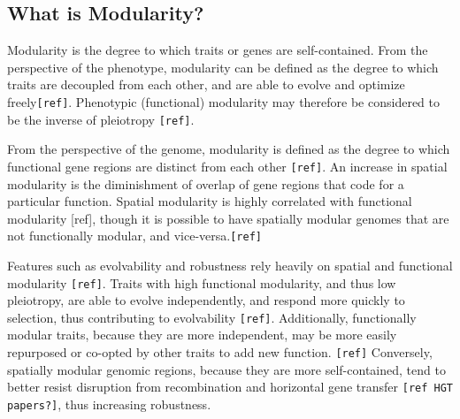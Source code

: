 \subsection{What is Modularity?}

Modularity is the degree to which traits or genes are self-contained. From the perspective of the phenotype, modularity can be defined as the degree to which traits are decoupled from each other, and are able to evolve and optimize freely\verb|[ref]|. Phenotypic (functional) modularity may therefore be considered to be the inverse of pleiotropy \verb|[ref]|.

From the perspective of the genome, modularity is defined as the degree to which functional gene regions are distinct from each other \verb|[ref]|. An increase in spatial modularity is the diminishment of overlap of gene regions that code for a particular function. Spatial modularity is highly correlated with functional modularity [ref], though it is possible to have spatially modular genomes that are not functionally modular, and vice-versa.\verb|[ref]|

Features such as evolvability and robustness rely heavily on spatial and functional modularity \verb|[ref]|. Traits with high functional modularity, and thus low pleiotropy, are able to evolve independently, and respond more quickly to selection, thus contributing to evolvability \verb|[ref]|. Additionally, functionally modular traits, because they are more independent, may be more easily repurposed or co-opted by other traits to add new function. \verb|[ref]|  Conversely, spatially modular genomic regions, because they are more self-contained, tend to better resist disruption from recombination \cite{misevic_sexual_2006} and horizontal gene transfer \verb|[ref HGT papers?]|, thus increasing robustness.

